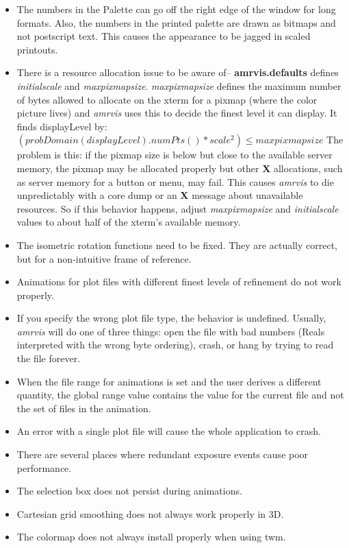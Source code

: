 \begin{itemize}
\item The numbers in the Palette can go off the right edge of the window
for long formats.  Also, the numbers in the printed palette are drawn as
bitmaps and not postscript text.  This causes the appearance to be jagged
in scaled printouts.

\item There is a resource allocation issue to be aware of--
{\bf amrvis.defaults} defines {\em initialscale} and {\em maxpixmapsize}.
{\em maxpixmapsize} defines the maximum number of bytes allowed to allocate
on the xterm for a pixmap (where the color picture lives) and {\em amrvis}
uses this to decide the finest level it can display.  It finds displayLevel
by:  \( (probDomain(displayLevel).numPts() * {scale^{2}}) \leq maxpixmapsize \)
The problem is this:  if the pixmap size is below but close to the
available server memory, the pixmap may be allocated properly but other
{\bf X} allocations, such as server memory for a button or menu, may fail.
This causes {\em amrvis} to die unpredictably with a core dump or an {\bf X}
message about unavailable resources.  So if this behavior happens, adjust
{\em maxpixmapsize} and {\em initialscale} values to about half
of the xterm's available memory.

\item The isometric rotation functions need to be fixed.  They are actually
correct, but for a non-intuitive frame of reference.

\item Animations for plot files with different finest levels of refinement
do not work properly.
  
\item If you specify the wrong plot file type, the behavior is undefined.
Usually, {\em amrvis} will do one of three things:  open the file with
bad numbers (Reals interpreted with the wrong byte ordering), crash, or
hang by trying to read the file forever.
  
\item When the file range for animations is set and the user derives
a different quantity, the global range value contains the value for
the current file and not the set of files in the animation.
  
\item An error with a single plot file will cause the whole application
to crash.
  
\item There are several places where redundant exposure events cause poor
performance.
  
\item The selection box does not persist during animations.

\item Cartesian grid smoothing does not always work properly in 3D.

\item The colormap does not always install properly when using twm.

\end{itemize}
